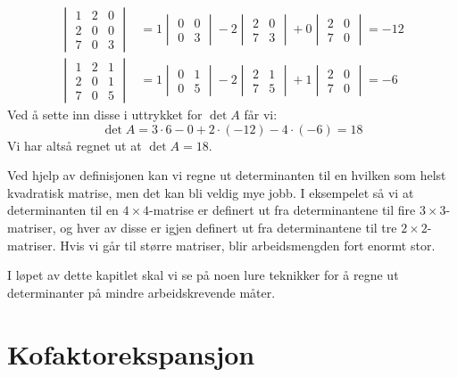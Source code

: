 \begin{ex}
\begin{align*}
\begin{vmatrix}
1 & 2 & 0 \\
2 & 0 & 0 \\
7 & 0 & 3
\end{vmatrix}
&=
  1 \begin{vmatrix} 0 & 0 \\ 0 & 3 \end{vmatrix}
- 2 \begin{vmatrix} 2 & 0 \\ 7 & 3 \end{vmatrix}
+ 0 \begin{vmatrix} 2 & 0 \\ 7 & 0 \end{vmatrix}
 = -12 \\
\begin{vmatrix}
1 & 2 & 1 \\
2 & 0 & 1 \\
7 & 0 & 5
\end{vmatrix}
&=
  1 \begin{vmatrix} 0 & 1 \\ 0 & 5 \end{vmatrix}
- 2 \begin{vmatrix} 2 & 1 \\ 7 & 5 \end{vmatrix}
+ 1 \begin{vmatrix} 2 & 0 \\ 7 & 0 \end{vmatrix}
 = -6
\end{align*}
Ved å sette inn disse i uttrykket for $\det A$ får vi:
\[
\det A = 3 \cdot 6 - 0 + 2 \cdot (-12) - 4 \cdot (-6) = 18
\]
Vi har altså regnet ut at $\det A = 18$.
\end{ex}

Ved hjelp av definisjonen kan vi regne ut determinanten til en hvilken
som helst kvadratisk matrise, men det kan bli veldig mye jobb.  I
eksempelet så vi at determinanten til en $4 \times 4$-matrise er
definert ut fra determinantene til fire $3 \times 3$-matriser, og hver
av disse er igjen definert ut fra determinantene til tre
$2 \times 2$-matriser.  Hvis vi går til større matriser, blir
arbeidsmengden fort enormt stor.

I løpet av dette kapitlet skal vi se på noen lure teknikker for å
regne ut determinanter på mindre arbeidskrevende måter.


\section*{Kofaktorekspansjon}

